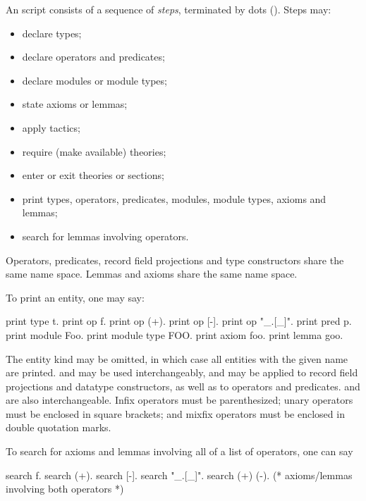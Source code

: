An \EasyCrypt script consists of a sequence of \emph{steps},
terminated by dots (). Steps may:
\begin{itemize}
\item declare types;

\item declare operators and predicates;

\item declare modules or module types;

\item state axioms or lemmas;

\item apply tactics;

\item require (make available) theories;

\item enter or exit theories or sections;

\item print types, operators, predicates, modules, module types,
  axioms and lemmas;

\item search for lemmas involving operators.
\end{itemize}

Operators, predicates, record field projections and type constructors
share the same name space. Lemmas and axioms share the same name
space.

To print an entity, one may say:
\begin{easycrypt}{}{}
print type t.
print op f.
print op (+).
print op [-].
print op "_.[_]".
print pred p.
print module Foo.
print module type FOO.
print axiom foo.
print lemma goo.
\end{easycrypt}
The entity kind may be omitted, in which case all entities with the
given name are printed.  and  may be used
interchangeably, and may be applied to record field projections and
datatype constructors, as well as to operators and predicates.
 and  are also interchangeable.
Infix operators must be parenthesized; unary operators must be
enclosed in square brackets; and mixfix operators must be enclosed
in double quotation marks.

To search for axioms and lemmas involving all of a list of operators,
one can say
\begin{easycrypt}{}{}
search f.
search (+).
search [-].
search "_.[_]".
search (+) (-).  (* axioms/lemmas involving both operators *)
\end{easycrypt}

